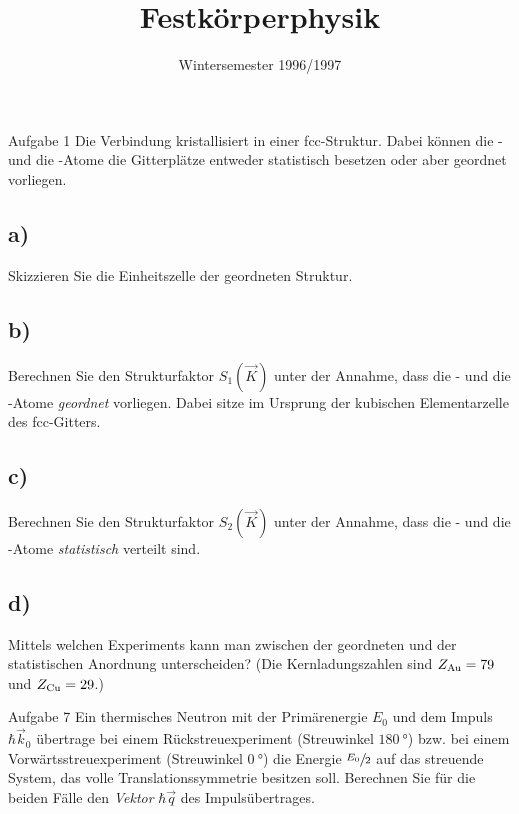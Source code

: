 

\subject{FKP}
\title{Festkörperphysik}
\date{
    Wintersemester 1996/1997
}



\maketitle
\thispagestyle{empty}
\newpage


\begin{aufgabe}{Aufgabe 1}
    Die Verbindung  kristallisiert in einer fcc-Struktur.
    Dabei können die - und die -Atome die Gitterplätze entweder statistisch besetzen oder aber geordnet vorliegen.

    \subsection{a)}
    Skizzieren Sie die Einheitszelle der geordneten Struktur.

    \subsection{b)}
    Berechnen Sie den Strukturfaktor $S_1(\vec K)$ unter der Annahme,
    dass die - und die -Atome \textit{geordnet} vorliegen.
    Dabei sitze  im Ursprung der kubischen Elementarzelle des fcc-Gitters.

    \subsection{c)}
    Berechnen Sie den Strukturfaktor $S_2(\vec K)$ unter der Annahme,
    dass die - und die -Atome \textit{statistisch} verteilt sind.

    \subsection{d)}
    Mittels welchen Experiments kann man zwischen der geordneten und der statistischen Anordnung unterscheiden?
    (Die Kernladungszahlen sind $Z_{\ce{Au}} = 79$ und $Z_{\ce{Cu}} = 29$.)
\end{aufgabe}

\begin{aufgabe}{Aufgabe 7}
    Ein thermisches Neutron mit der Primärenergie $E_0$ und dem Impuls $\hbar \vec k_0$ übertrage
    bei einem Rückstreuexperiment (Streuwinkel $\SI{180}{\degree}$) bzw.
    bei einem Vorwärtsstreuexperiment (Streuwinkel $\SI{0}{\degree}$)
    die Energie $\sfrac{E_0}{2}$ auf das streuende System,
    das volle Translationssymmetrie besitzen soll.
    Berechnen Sie für die beiden Fälle den \textit{Vektor} $\hbar \vec q$ des Impulsübertrages.
\end{aufgabe}

